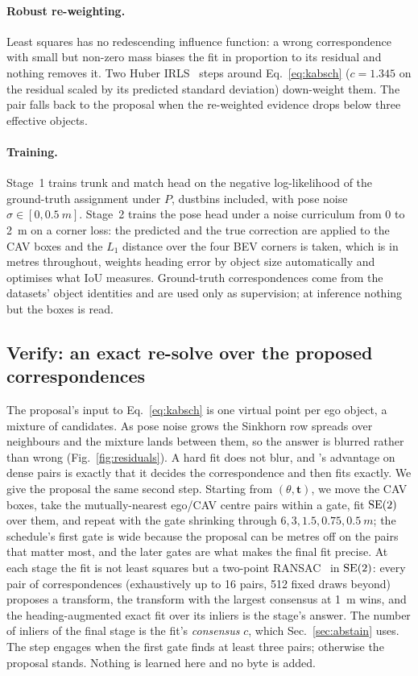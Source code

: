 \paragraph{Robust re-weighting.}
Least squares has no redescending influence function: a wrong correspondence with small but non-zero mass biases the fit in proportion to its residual and nothing removes it. Two Huber IRLS~\cite{huber1964robust} steps around Eq.~\eqref{eq:kabsch} ($c=1.345$ on the residual scaled by its predicted standard deviation) down-weight them. The pair falls back to the proposal when the re-weighted evidence drops below three effective objects.

\paragraph{Training.}
Stage~1 trains trunk and match head on the negative log-likelihood of the ground-truth assignment under $P$, dustbins included, with pose noise $\sigma\in[0,\SI{0.5}{m}]$. Stage~2 trains the pose head under a noise curriculum from 0 to \SI{2}{m} on a corner loss: the predicted and the true correction are applied to the CAV boxes and the $L_1$ distance over the four BEV corners is taken, which is in metres throughout, weights heading error by object size automatically and optimises what IoU measures. Ground-truth correspondences come from the datasets' object identities and are used only as supervision; at inference nothing but the boxes is read.

\subsection{Verify: an exact re-solve over the proposed correspondences}
\label{sec:verify}
The proposal's input to Eq.~\eqref{eq:kabsch} is one virtual point per ego object, a mixture of candidates. As pose noise grows the Sinkhorn row spreads over neighbours and the mixture lands between them, so the answer is blurred rather than wrong (Fig.~\ref{fig:residuals}). A hard fit does not blur, and \freealign's advantage on dense pairs is exactly that it decides the correspondence and then fits exactly. We give the proposal the same second step. Starting from $(\theta,\mathbf{t})$, we move the CAV boxes, take the mutually-nearest ego/CAV centre pairs within a gate, fit $\mathrm{SE}(2)$ over them, and repeat with the gate shrinking through $6, 3, 1.5, 0.75, \SI{0.5}{m}$; the schedule's first gate is wide because the proposal can be metres off on the pairs that matter most, and the later gates are what makes the final fit precise. At each stage the fit is not least squares but a two-point RANSAC~\cite{fischler1981ransac} in $\mathrm{SE}(2)$: every pair of correspondences (exhaustively up to 16 pairs, 512 fixed draws beyond) proposes a transform, the transform with the largest consensus at \SI{1}{m} wins, and the heading-augmented exact fit over its inliers is the stage's answer. The number of inliers of the final stage is the fit's \emph{consensus} $c$, which Sec.~\ref{sec:abstain} uses. The step engages when the first gate finds at least three pairs; otherwise the proposal stands. Nothing is learned here and no byte is added.

